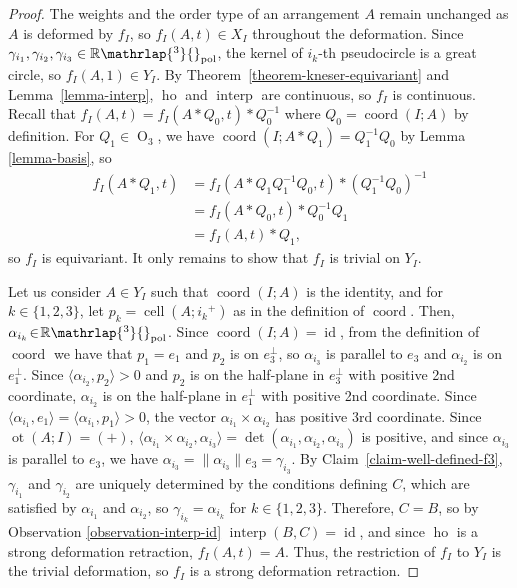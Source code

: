 \documentclass[JEP,XML,SOM,Unicode,NoFloatCountersInSection,published]{cedram}
\theoremstyle{remark}
\let\mb\mathbb
\DeclareMathOperator{\orth}{O}
\DeclareMathOperator{\cell}{cell}
\newcommand{\Rpol}[1]{\mb{R}\mathrlap{{}^{#1}}{}_\text{pol}}
\DeclareMathOperator{\interp}{interp}
\DeclareMathOperator{\coord}{coord}
\DeclareMathOperator{\ho}{ho}
\DeclareMathOperator{\id}{id}
\DeclareMathOperator{\ot}{ot}
\begin{document}
\begin{proof}
The weights and the order type of an arrangement $A$ remain unchanged as $A$ is deformed by $f_I$, so $f_I(A,t) \in X_I$ throughout the deformation.
Since $\gamma_{i_1},\gamma_{i_2},\gamma_{i_3} \in \Rpol{3}$, the kernel of $i_k$-th pseudocircle is a great circle, so $f_I(A,1) \in Y_I$. By Theorem~\ref{theorem-kneser-equivariant} and Lemma~\ref{lemma-interp}, $\ho$ and $\interp$ are continuous, so $f_I$ is continuous.
Recall that $f_I(A,t) = f_I(A*Q_0,t)*Q_0^{-1}$ where $Q_0 = \coord(I;A)$ by definition.
For $Q_1 \in \orth_3$,
we have ${\coord(I;A*Q_1) = Q_1^{-1}Q_0}$ by Lemma \ref{lemma-basis}, so
\begin{align*}
f_I(A*Q_1,t) & = f_I(A*Q_1Q_1^{-1}Q_0,t)*(Q_1^{-1}Q_0)^{-1} \\
& = f_I(A*Q_0,t)*Q_0^{-1}Q_1 \\
& = f_I(A,t)*Q_1,
\end{align*}
so $f_I$ is equivariant.
It only remains to show that $f_I$ is trivial on $Y_I$.

Let us consider $A\!\in\!Y_I$ such that $\coord(I;A)$ is the identity,
and for $k\!\in\!\{1,2,3\}$, let $p_k\!=\!\cell(A;{i_k}^+)$ as in the definition of $\coord$.
Then, $\alpha_{i_k}\!\in\!\Rpol{3}$. Since \hbox{$\coord(I;A)\!=\!\id$}, from the definition of $\coord$ we have that $p_1 = e_1$ and $p_2$ is on $e_3^\bot$, so $\alpha_{i_3}$ is parallel to $e_3$ and $\alpha_{i_2}$ is on $e_1^\bot$.
Since $\langle \alpha_{i_2},p_2 \rangle > 0$ and $p_2$ is on the half-plane in $e_3^\bot$ with positive 2nd coordinate, $\alpha_{i_2}$ is on the half-plane in $e_1^\bot$ with positive 2nd coordinate.
Since $\langle \alpha_{i_1},e_1 \rangle = \langle \alpha_{i_1},p_1 \rangle > 0$,
the vector $\alpha_{i_1} \times \alpha_{i_2}$ has positive 3rd coordinate.
Since $\ot(A;I) = (+)$,
$\langle \alpha_{i_1} \times \alpha_{i_2}, \alpha_{i_3} \rangle = \det(\alpha_{i_1},\alpha_{i_2},\alpha_{i_3})$ is positive, and since $\alpha_{i_3}$ is parallel to $e_3$, we have $\alpha_{i_3} = \|\alpha_{i_3}\|e_3 = \gamma_{i_3}$.
By Claim~\ref{claim-well-defined-f3}, $\gamma_{i_1}$ and $\gamma_{i_2}$ are uniquely determined by the conditions defining $C$, which are satisfied by $\alpha_{i_1}$ and $\alpha_{i_2}$, so \hbox{$\gamma_{i_k} = \alpha_{i_k}$} for $k\in\{1,2,3\}$. Therefore, $C=B$, so by Observation \ref{observation-interp-id} $\interp(B,C) = \id$, and since $\ho$ is a strong deformation retraction, $f_I(A,t) = A$. Thus, the restriction of $f_I$ to $Y_I$ is the trivial deformation, so $f_I$ is a strong deformation retraction.
\end{proof}
\end{document}
